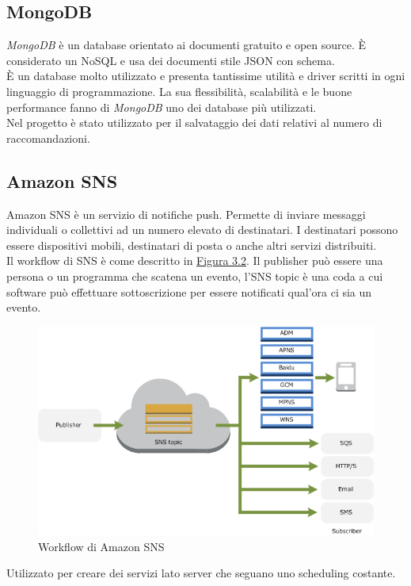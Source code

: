 \documentclass[a4paper, 12pt, twoside, openright]{book}
\begin{document}
\subsection{MongoDB}
\textit{MongoDB} è un database orientato ai documenti gratuito e open source. \`{E} considerato un NoSQL e usa dei documenti stile JSON con schema.\\
\`{E} un database molto utilizzato e presenta tantissime utilità e driver scritti in ogni linguaggio di programmazione. La sua flessibilità, scalabilità e le buone performance fanno di \textit{MongoDB} uno dei database più utilizzati.\\
Nel progetto è stato utilizzato per il salvataggio dei dati relativi al numero di raccomandazioni.\\

\subsection{Amazon SNS}
Amazon SNS è un servizio di notifiche push. Permette di inviare messaggi individuali o collettivi ad un numero elevato di destinatari. I destinatari possono essere dispositivi mobili, destinatari di posta o anche altri servizi distribuiti.\\
Il workflow di SNS è come descritto in \hyperref[sns-workflow]{Figura 3.2}. Il publisher può essere una persona o un programma che scatena un evento, l'SNS topic è una coda a cui software può effettuare sottoscrizione per essere notificati qual'ora ci sia un evento.
\begin{figure}[H]
	\centering
	\label{sns-workflow}
	\includegraphics[width=1.0\textwidth]{images/sns-workflow.png}
	\caption{Workflow di Amazon SNS}
\end{figure} 
Utilizzato per creare dei servizi lato server che seguano uno scheduling costante.\\
\end{document}
